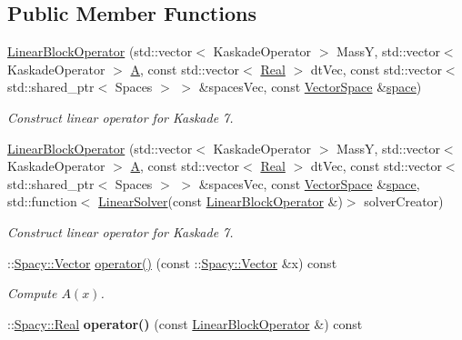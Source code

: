 \subsection*{Public Member Functions}
\begin{DoxyCompactItemize}
\item 
\hyperlink{classSpacy_1_1KaskadeParabolic_1_1PDE_1_1LinearBlockOperator_a056409a87a1ff0ab0f66ca23f4d9e843}{Linear\-Block\-Operator} (std\-::vector$<$ Kaskade\-Operator $>$ Mass\-Y, std\-::vector$<$ Kaskade\-Operator $>$ \hyperlink{classSpacy_1_1KaskadeParabolic_1_1PDE_1_1LinearBlockOperator_a69d4967d9041ca82f4cd50a40e9ce191}{A}, const std\-::vector$<$ \hyperlink{classSpacy_1_1Real}{Real} $>$ dt\-Vec, const std\-::vector$<$ std\-::shared\-\_\-ptr$<$ Spaces $>$ $>$ \&spaces\-Vec, const \hyperlink{classSpacy_1_1VectorSpace}{Vector\-Space} \&\hyperlink{classSpacy_1_1VectorBase_aa999dbf9d679d895dfe04c10fbf9f5e9}{space})
\begin{DoxyCompactList}\small\item\em Construct linear operator for Kaskade 7. \end{DoxyCompactList}\item 
\hyperlink{classSpacy_1_1KaskadeParabolic_1_1PDE_1_1LinearBlockOperator_a965f0e0e5c64267db219bcd9c6d13988}{Linear\-Block\-Operator} (std\-::vector$<$ Kaskade\-Operator $>$ Mass\-Y, std\-::vector$<$ Kaskade\-Operator $>$ \hyperlink{classSpacy_1_1KaskadeParabolic_1_1PDE_1_1LinearBlockOperator_a69d4967d9041ca82f4cd50a40e9ce191}{A}, const std\-::vector$<$ \hyperlink{classSpacy_1_1Real}{Real} $>$ dt\-Vec, const std\-::vector$<$ std\-::shared\-\_\-ptr$<$ Spaces $>$ $>$ \&spaces\-Vec, const \hyperlink{classSpacy_1_1VectorSpace}{Vector\-Space} \&\hyperlink{classSpacy_1_1VectorBase_aa999dbf9d679d895dfe04c10fbf9f5e9}{space}, std\-::function$<$ \hyperlink{namespaceSpacy_adcd0d78166a9c972b8a2e5a689fc2d03}{Linear\-Solver}(const \hyperlink{classSpacy_1_1KaskadeParabolic_1_1PDE_1_1LinearBlockOperator}{Linear\-Block\-Operator} \&)$>$ solver\-Creator)
\begin{DoxyCompactList}\small\item\em Construct linear operator for Kaskade 7. \end{DoxyCompactList}\item 
\-::\hyperlink{classSpacy_1_1Vector}{Spacy\-::\-Vector} \hyperlink{classSpacy_1_1KaskadeParabolic_1_1PDE_1_1LinearBlockOperator_a17798ab614892c1bbb922468896b9736}{operator()} (const \-::\hyperlink{classSpacy_1_1Vector}{Spacy\-::\-Vector} \&x) const 
\begin{DoxyCompactList}\small\item\em Compute $A(x)$. \end{DoxyCompactList}\item 
\hypertarget{classSpacy_1_1KaskadeParabolic_1_1PDE_1_1LinearBlockOperator_a19c28ac28635e98f2e24a74f115f5825}{\-::\hyperlink{classSpacy_1_1Real}{Spacy\-::\-Real} {\bfseries operator()} (const \hyperlink{classSpacy_1_1KaskadeParabolic_1_1PDE_1_1LinearBlockOperator}{Linear\-Block\-Operator} \&) const }\label{classSpacy_1_1KaskadeParabolic_1_1PDE_1_1LinearBlockOperator_a19c28ac28635e98f2e24a74f115f5825}


\end{DoxyCompactItemize}
